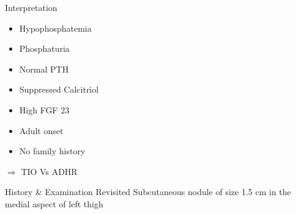 \begin{frame}{ Interpretation }
\begin{tcolorbox}[colback=teal!5!white,colframe=teal!75!black,sidebyside]
	\begin{itemize}
	\item Hypophosphatemia
	\item Phosphaturia
	\item Normal PTH
	\item Suppressed Calcitriol
	\item High FGF 23
	\end{itemize}
	\tcblower%
	\begin{itemize}
		\item Adult onset
		\item No family history
	\end{itemize}
\end{tcolorbox}
\pause
\bigskip
$ \Longrightarrow $ TIO Vs ADHR
\end{frame} 

\begin{frame} {History \& Examination Revisited}
	Subcutaneous nodule of size 1.5 cm in the medial aspect of left thigh
\end{frame}

